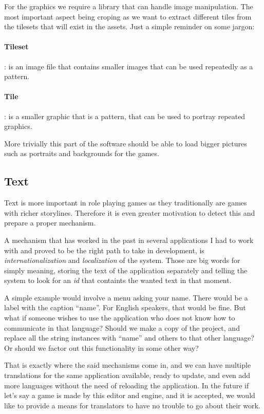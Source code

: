 For the graphics we require a library that can handle image manipulation. The
most important aspect being croping as we want to extract different tiles from
the tilesets that will exist in the assets. Just a simple reminder on some
jargon:

\paragraph{Tileset}: is an image file that contains smaller images that can be
used repeatedly as a pattern.

\paragraph{Tile}: is a smaller graphic that is a pattern, that can be used to
portray repeated graphics.

More trivially this part of the software should be able to load bigger pictures
such as portraits and backgrounds for the games.

\subsection{Text}

Text is more important in role playing games as they traditionally are games
with richer storylines. Therefore it is even greater motivation to detect this
and prepare a proper mechanism.

A mechanism that has worked in the past in several applications I had to work
with and proved to be the right path to take in development, is
\textit{internationalization} and \textit{localization} of the system. Those
are big words for simply meaning, storing the text of the application separately
and telling the system to look for an \textit{id} that containts the wanted
text in that moment.

A simple example would involve a menu asking your name. There would be a label
with the caption ``name''. For English speakers, that would be fine. But what
if someone wishes to use the application who does not know how to communicate
in that language? Should we make a copy of the project, and replace all the
string instances with ``name'' and others to that other language? Or should we
factor out this functionality in some other way?

That is exactly where the said mechanisms come in, and we can have multiple
translations for the same application available, ready to update, and even add
more languages without the need of reloading the application. In the future if
let's say a game is made by this editor and engine, and it is accepted, we
would like to provide a means for translators to have no trouble to go about
their work.


